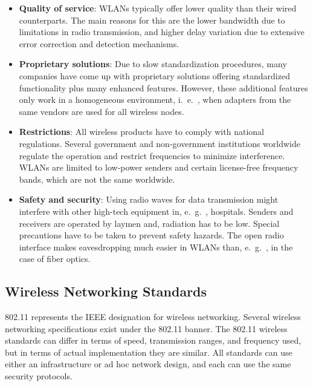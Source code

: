 \begin{multicols}{2}
\begin{itemize}
	\item \textbf{Quality of service}: WLANs typically offer lower quality than their wired counterparts. The main reasons for this are the lower bandwidth due to limitations in radio transmission, and higher delay variation due to extensive error correction and detection mechanisms.
	
	
	
	\item \textbf{Proprietary solutions}: Due to slow standardization procedures, many companies have come up with proprietary solutions offering standardized functionality plus many enhanced features. However, these additional features only work in a homogeneous environment, i.\ e.\ , when adapters from the same vendors are used for all wireless nodes.
	
	
	\item \textbf{Restrictions}: All wireless products have to comply with national regulations. Several government and non-government institutions worldwide regulate the operation and restrict frequencies to minimize interference. WLANs are limited to low-power senders and certain license-free frequency bands, which are not the same worldwide.
	
	\item \textbf{Safety and security}: Using radio waves for data transmission might interfere with other high-tech equipment in, e.\ g.\ , hospitals. Senders and
	receivers are operated by laymen and, radiation has to be low. Special precautions have to be taken to prevent safety hazards. The open radio interface makes eavesdropping much easier in WLANs than, e.\ g.\ , in the case of fiber optics.
	
\end{itemize}
\end{multicols}



\subsection{Wireless Networking Standards}

802.11 represents the IEEE designation for wireless networking. Several wireless networking specifications exist under the 802.11 banner. The 802.11 wireless standards can differ in terms of speed, transmission ranges, and frequency used, but
in terms of actual implementation they are similar. All standards can use either an
infrastructure or ad hoc network design, and each can use the same security
protocols.


